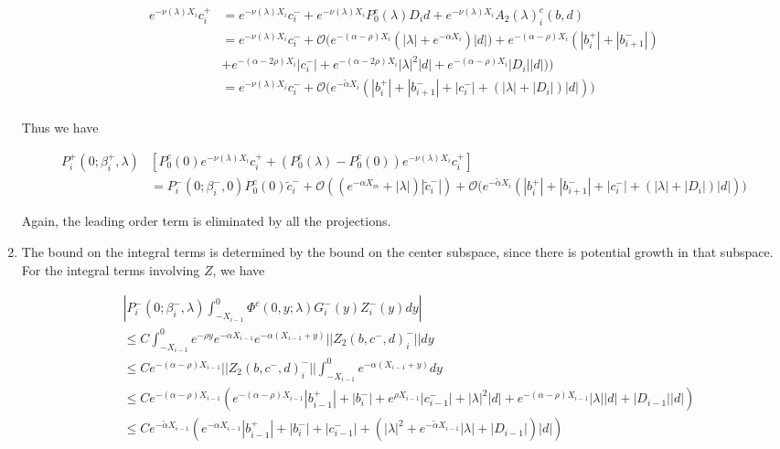 \documentclass[12pt]{article}
\begin{document}
\begin{enumerate}
\begin{align*}
e^{-\nu(\lambda)X_i} c_i^+ &= e^{-\nu(\lambda)X_i} c_i^- 
+ e^{-\nu(\lambda)X_i} P_0^c(\lambda) D_i d + e^{-\nu(\lambda)X_i} A_2(\lambda)_i^c(b, d)\\
&= e^{-\nu(\lambda)X_i} c_i^- + \mathcal{O}\Big( e^{-(\alpha - \rho) X_i} ( |\lambda| + e^{-\alpha X_i} ) |d|) + e^{-(\alpha - \rho) X_i} (|b_i^+| + |b_{i+1}^-|) \\
&+ e^{-(\alpha - 2 \rho) X_i} |c_i^-| + e^{-(\alpha - 2 \rho) X_i} |\lambda|^2|d| + e^{-(\alpha - \rho) X_i} |D_i||d| ) \Big) \\
&= e^{-\nu(\lambda)X_i} c_i^- + \mathcal{O}\Big( e^{-\tilde{\alpha} X_i} ( |b_i^+| + |b_{i+1}^-| + |c_i^-| + (|\lambda| + |D_i| ) |d|) \Big) \\
\end{align*}

Thus we have

\begin{align*}
P_i^+(0; \beta_i^+, \lambda)&[ P_0^c(0) e^{-\nu(\lambda) X_i} c_i^+ + (P_0^c(\lambda) - P_0^c(0)) e^{-\nu(\lambda) X_i} c_i^+] \\
&= P_i^-(0; \beta_i^-, 0) P_0^c(0) \tilde{c}_i^- + \mathcal{O}((e^{-\alpha X_m} + |\lambda|)|\tilde{c}_i^-|)
+ \mathcal{O}\Big( e^{-\tilde{\alpha} X_i} ( |b_i^+| + |b_{i+1}^-| + |c_i^-| + (|\lambda| + |D_i| ) |d|) \Big)
\end{align*}

Again, the leading order term is eliminated by all the projections.

\item The bound on the integral terms is determined by the bound on the center subspace, since there is potential growth in that subspace. For the integral terms involving $Z$, we have

\begin{align*}
&\left| P_i^-(0; \beta_i^-, \lambda) \int_{-X_{i-1}}^0 \Phi^c(0, y; \lambda) G_i^-(y) Z_i^-(y) dy \right| \\
&\leq C \int_{-X_{i-1}}^0 e^{-\rho y} e^{-\alpha X_{i-1}} e^{-\alpha(X_{i-1} + y) } ||Z_2(b, c^-, d)_i^-|| dy \\
&\leq C e^{-(\alpha - \rho) X_{i-1}} ||Z_2(b, c^-, d)_i^-|| \int_{-X_{i-1}}^0 e^{-\alpha(X_{i-1} + y) } dy \\
&\leq C e^{-(\alpha - \rho) X_{i-1}} ( e^{-(\alpha - \rho) X_{i-1}} |b_{i-1}^+| + |b_i^-| + e^{\rho X_{i-1}}|c_{i-1}^-| 
+ |\lambda|^2 |d| + e^{-(\alpha - \rho)X_{i-1}}|\lambda||d| + |D_{i-1}||d| ) \\
&\leq C e^{-\tilde{\alpha} X_{i-1}} \left( e^{-\alpha X_{i-1}} |b_{i-1}^+| + |b_i^-| + |c_{i-1}^-| + (|\lambda|^2 + e^{-\tilde{\alpha} X_{i-1}}|\lambda| + |D_{i-1}|) |d| \right)
\end{align*}


\end{enumerate}
\end{document}
